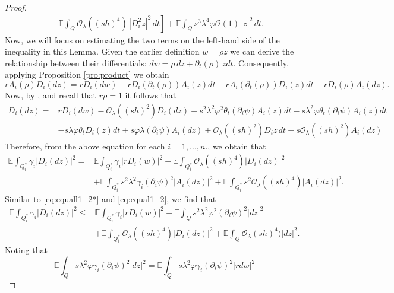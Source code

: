\documentclass[11pt,oneside,leqno]{amsart}
\numberwithin{equation}{section}
\numberwithin{equation}{section}
\newcommand{\E}{\mathbb{E}}
\begin{document}
\begin{proof}
\begin{equation}
\begin{split}
    &\left.+\E\int_{Q}\mathcal{O}_{\lambda}((sh)^4)\,|D^2_iz|^2\,dt\right]+\E\int_{Q}s^3\lambda^4\varphi\mathcal{O}(1)\,|z|^2\,dt.
\end{split}
\end{equation}
Now, we will focus on estimating the two terms on the left-hand side of the inequality in this Lemma. Given the earlier definition $w=\rho z$ we can derive the relationship between their differentials: $dw=\rho\,dz+\partial_{t}(\rho)\,zdt$. Consequently, applying Proposition \ref{pro:product} we obtain   $$rA_i(\rho)D_i(dz)=rD_i(dw)-rD_i(\partial_t(\rho))A_i(z)dt-rA_i(\partial_t(\rho))D_i(z)dt-rD_i(\rho)A_i(dz).$$ 
Now, by {\cite[Lemma 3.7]{BHLR:2010b}}, {\cite[Corollary 3.8]{BHLR:2010b}} and recall that $r\rho=1$ it follows that
\begin{align*}
D_i(dz)=&rD_i(dw)-\mathcal{O}_{\lambda}((sh)^2)D_i(dz)+s^2\lambda^2\varphi ^2\theta_t(\partial_i\psi)A_i(z)dt-s\lambda^2\varphi\theta_t(\partial_i\psi)A_i(z)dt\\
&-s\lambda\varphi \theta_t D_i(z)dt+s\varphi\lambda(\partial_i\psi)A_i(dz)+\mathcal{O}_\lambda((sh)^2)D_iz\,dt-s\mathcal{O}_{\lambda}((sh)^2)A_i(dz)
\end{align*}
Therefore, from the above equation for each $i{ =1,...,n.}$, we obtain that
\begin{equation*}
    \begin{split}
        \E\int_{Q_i^{\ast}}\gamma_i|D_i(dz)|^2=& \E\int_{Q_i^{\ast}}\gamma_i|rD_i(w)|^2+\E\int_{Q_i^{\ast}}\mathcal{O}_{\lambda}((sh)^4)|D_i(dz)|^2\\
        &+\E\int_{Q_i^{\ast}}s^2\lambda^2\gamma_i(\partial_i\psi)^2|A_i(dz)|^2+\E\int_{Q_i^{\ast}}s^2\mathcal{O}_{\lambda}((sh)^4)|A_i(dz)|^2.
    \end{split}
\end{equation*}
Similar to \eqref{eq:equall1_2*} and \eqref{eq:equal1_2}, we find that
\begin{equation}\label{eq:Di(dz)}
\begin{split}
\E\int_{Q_i^{\ast}}\gamma_i|D_i(dz)|^2\leq& \E\int_{Q_i^{\ast}}\gamma_i|rD_i(w)|^2+\E\int_{Q}s^2\lambda^2\varphi^2(\partial_i\psi)^2|dz|^2\\
&+\E\int_{Q_i^{\ast}}\mathcal{O}_{\lambda}((sh)^4)|D_i(dz)|^2+\E\int_{Q}\mathcal{O}_{\lambda}(sh)^4)|dz|^2.
\end{split}
\end{equation}
Noting that 
\begin{equation*}
    \E\int_{Q}s\lambda^2\varphi\gamma_i(\partial_i\psi)^2|dz|^2=\E\int_{Q}s\lambda^2\varphi\gamma_i(\partial_i\psi)^2|rdw|^2

\end{equation*}
\end{proof}
\end{document}
